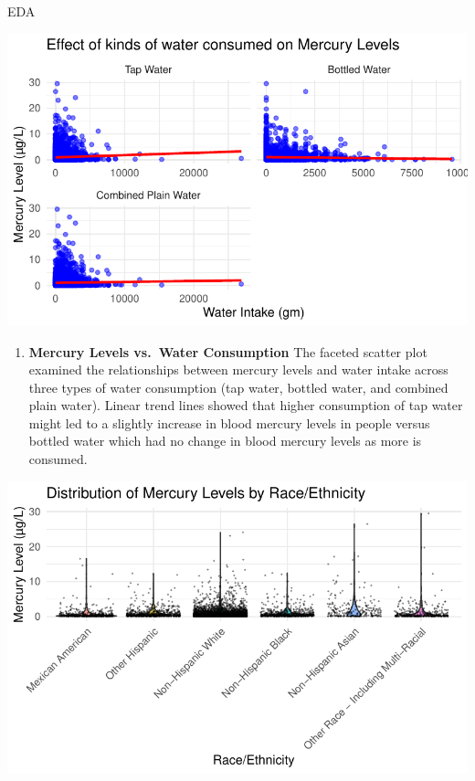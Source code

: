 \documentclass[
  letterpaper,
  DIV=11,
  numbers=noendperiod]{scrartcl}
\makeatletter
\let\oldparagraph\paragraph
\renewcommand{\paragraph}{
    \@ifstar
      \xxxParagraphStar
      \xxxParagraphNoStar
  }
\newcommand{\xxxParagraphStar}[1]{\oldparagraph*{#1}\mbox{}}
\newcommand{\xxxParagraphNoStar}[1]{\oldparagraph{#1}\mbox{}}
\providecommand{\tightlist}{%
  \setlength{\itemsep}{0pt}\setlength{\parskip}{0pt}}\usepackage{longtable,booktabs,array}
\makeatother
\begin{document}
\paragraph{EDA}\label{eda}

\includegraphics{_IDS702_Final_Report_Feedback_files/figure-pdf/plots-2b-1.pdf}

\begin{enumerate}
\def\labelenumi{\arabic{enumi}.}
\tightlist
\item
  \textbf{Mercury Levels vs.~Water Consumption} The faceted scatter plot
  examined the relationships between mercury levels and water intake
  across three types of water consumption (tap water, bottled water, and
  combined plain water). Linear trend lines showed that higher
  consumption of tap water might led to a slightly increase in blood
  mercury levels in people versus bottled water which had no change in
  blood mercury levels as more is consumed.
\end{enumerate}

\includegraphics{_IDS702_Final_Report_Feedback_files/figure-pdf/plots-3b-1.pdf}
\end{document}
